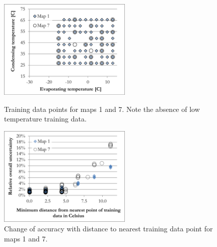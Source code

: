\begin{figure}[h]
\begin{minipage}{15pc}
\includegraphics[width=15pc]{./fig/Map_1_and_7_training_data.pdf}
\caption{\label{fig:map_1_7_training_data}Training data points for maps 1 and 7. Note the absence of low temperature training data.}
\end{minipage}\hspace{2pc}%
\begin{minipage}{15pc}
\includegraphics[width=15pc]{./fig/Map_1_and_7_C_distance.pdf}
\caption{\label{fig:map_1_7_unc_C_distance}Change of accuracy with distance to nearest training data point for maps 1 and 7.}
\end{minipage} 
\end{figure}


